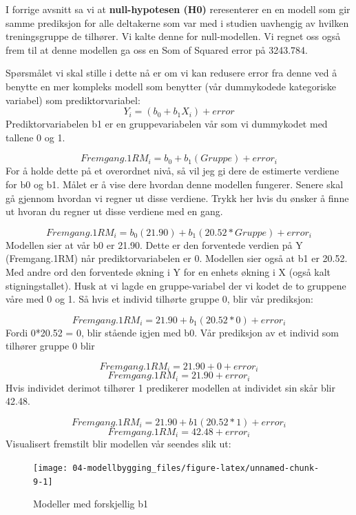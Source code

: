 \documentclass[
]{book}
\begin{document}
I forrige avsnitt sa vi at \textbf{null-hypotesen (H0)} reresenterer en en modell som gir samme prediksjon for alle deltakerne som var med i studien uavhengig av hvilken treningsgruppe de tilhører. Vi kalte denne for null-modellen. Vi regnet oss også frem til at denne modellen ga oss en Som of Squared error på 3243.784.

Spørsmålet vi skal stille i dette nå er om vi kan redusere error fra denne ved å benytte en mer kompleks modell som benytter (vår dummykodede kategoriske variabel) som prediktorvariabel:
\[
Y_i = (b_0 + b_1X_i) + error
\]
Prediktorvariabelen b1 er en gruppevariabelen vår som vi dummykodet med tallene 0 og 1.

\[
Fremgang.1RM_i = b_0 + b_1(Gruppe) + error_i
\]
For å holde dette på et overordnet nivå, så vil jeg gi dere de estimerte verdiene for b0 og b1. Målet er å vise dere hvordan denne modellen fungerer. Senere skal gå gjennom hvordan vi regner ut disse verdiene. Trykk her hvis du ønsker å finne ut hvoran du regner ut disse verdiene med en gang.

\[
Fremgang.1RM_i = b_0(21.90) + b_1(20.52*Gruppe) + error_i
\]
Modellen sier at vår b0 er 21.90. Dette er den forventede verdien på Y (Fremgang.1RM) når prediktorvariabelen er 0. Modellen sier også at b1 er 20.52. Med andre ord den forventede økning i Y for en enhets økning i X (også kalt stigningstallet). Husk at vi lagde en gruppe-variabel der vi kodet de to gruppene våre med 0 og 1. Så hvis et individ tilhørte gruppe 0, blir vår prediksjon:

\[
Fremgang.1RM_i = 21.90 + b_1(20.52*0) + error_i
\]
Fordi 0*20.52 = 0, blir stående igjen med b0. Vår prediksjon av et individ som tilhører gruppe 0 blir

\[
Fremgang.1RM_i = 21.90 + 0 + error_i
\]
\[
Fremgang.1RM_i = 21.90 + error_i
\]
Hvis individet derimot tilhører 1 predikerer modellen at individet sin skår blir 42.48.

\[
Fremgang.1RM_i = 21.90 + b1(20.52*1) + error_i
\]
\[
Fremgang.1RM_i = 42.48 + error_i
\]
Visualisert fremstilt blir modellen vår seendes slik ut:

\begin{figure}

{\centering \texttt{[image: 04-modellbygging\_files/figure-latex/unnamed-chunk-9-1]} 

}

\caption{Modeller med forskjellig b1}\label{fig:unnamed-chunk-9}
\end{figure}
\end{document}
